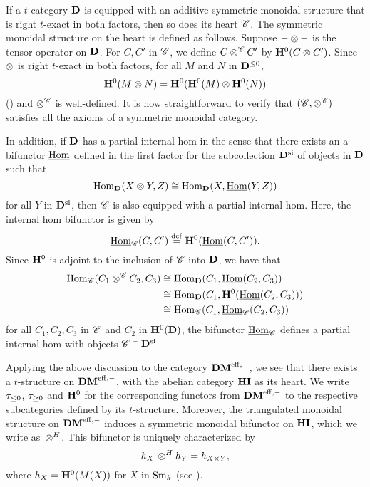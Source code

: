 If a $t$-category $\mathbf{D}$ is equipped with an additive symmetric 
monoidal structure that is right $t$-exact in both factors, then 
so does its heart $\mathscr{C}$. The symmetric monoidal structure on
the heart is defined as follows. Suppose $- \otimes -$ is the 
tensor operator on $\mathbf{D}$. For $C, C'$ in $\mathscr{C}$, we define $C 
\otimes^{\mathscr{C}} C'$ by $\mathbf{H}^0(C \otimes C')$. 
Since $\otimes$ is right $t$-exact in both factors, for all $M$ 
and $N$ in $\mathbf{D}^{\leq 0}$,
\[
\mathbf{H}^0(M \otimes N) = \mathbf{H}^0(\mathbf{H}^0(M) \otimes \mathbf{H}^0(N))
\]
(\cite[5.10]{DegModHom}) and $\otimes^{\mathscr{C}}$ is well-defined.
It is now straightforward to verify that $(\mathscr{C}, 
\otimes^{\mathscr{C}})$ satisfies all the axioms of a symmetric 
monoidal category. 

In addition, if $\mathbf{D}$ has a partial internal hom in the sense
that there exists an a bifunctor $\underline{\mathrm{Hom}}$ defined in the first 
factor for the subcollection $\mathbf{D}^{\mathrm{si}}$ of \SemiInvertible
objects in $\mathbf{D}$ such that
\[
\mathrm{Hom}_{\mathbf{D}}(X \otimes Y, Z) \cong 
   \mathrm{Hom}_{\mathbf{D}}(X, \underline{\mathrm{Hom}}(Y, Z))
\]
for all $Y$ in $\mathbf{D}^{\mathrm{si}}$, then $\mathscr{C}$ is also equipped
with a partial internal hom. Here, the internal hom bifunctor is given 
by
\[
\underline{\mathrm{Hom}}_{\mathscr{C}}(C, C') \stackrel{\mathrm{def}}{=} \mathbf{H}^0(\underline{\mathrm{Hom}}(C, C')).
\]
Since $\mathbf{H}^0$ is adjoint to the inclusion of $\mathscr{C}$ into
$\mathbf{D}$, we have that
\begin{align*}
\mathrm{Hom}_{\mathscr{C}}(C_1 \otimes^{\mathscr{C}} C_2, C_3) &\cong
\mathrm{Hom}_{\mathbf{D}}(C_1, \underline{\mathrm{Hom}}(C_2, C_3)) \\
&\cong \mathrm{Hom}_{\mathbf{D}}(C_1, \mathbf{H}^0(\underline{\mathrm{Hom}}(C_2, C_3))) \\
&\cong \mathrm{Hom}_{\mathscr{C}}(C_1, \underline{\mathrm{Hom}}_{\mathscr{C}}(C_2, C_3))
\end{align*}
for all $C_1, C_2, C_3$ in $\mathscr{C}$ and $C_2$ in $\mathbf{H}^0(\mathbf{D})$,
the bifunctor $\underline{\mathrm{Hom}}_{\mathscr{C}}$ defines a partial internal hom 
with \SemiInvertible objects $\mathscr{C} \cap \mathbf{D}^{\mathrm{si}}$.

Applying the above discussion to the category $\mathbf{DM}^{\mathrm{eff},-}$, we see 
that there exists a $t$-structure on $\mathbf{DM}^{\mathrm{eff},-}$, with the abelian 
category $\mathbf{HI}$ as its heart. We write $\tau_{\leq 0}$, $\tau_{\geq 0}$
and $\mathbf{H}^0$ for the corresponding functors from $\mathbf{DM}^{\mathrm{eff},-}$ to the 
respective subcategories defined by its $t$-structure. Moreover, 
the triangulated monoidal structure on $\mathbf{DM}^{\mathrm{eff},-}$ induces a 
symmetric monoidal bifunctor on $\mathbf{HI}$, which we write as $\,\otimes^H$. 
This bifunctor is uniquely characterized by
\[
h_{X} \,\otimes^H h_{Y} = h_{X \times Y},
\]
where $h_{X} = \mathbf{H}^0(M(X))$ for $X$ in $\mathrm{Sm}_{k}$ (see 
\cite[1.8]{DegModHom}).

